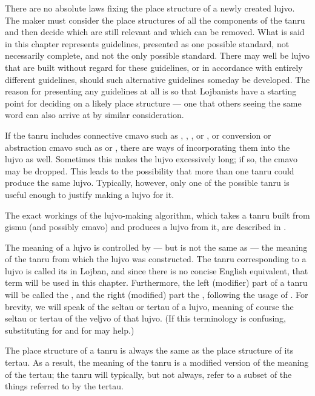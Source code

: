 There are no absolute laws fixing the place structure of a
    newly created lujvo. The maker must consider the place
    structures of all the components of the tanru and then decide
    which are still relevant and which can be removed. What is said
    in this chapter represents guidelines, presented as one
    possible standard, not necessarily complete, and not the only
    possible standard. There may well be lujvo that are built
    without regard for these guidelines, or in accordance with
    entirely different guidelines, should such alternative
    guidelines someday be developed. The reason for presenting any
    guidelines at all is so that Lojbanists have a starting point
    for deciding on a likely place structure --- one that others
    seeing the same word can also arrive at by similar
    consideration.

If the tanru includes connective cmavo such as ,
    , , or , or conversion or abstraction cmavo
    such as  or , there are ways of incorporating them
    into the lujvo as well. Sometimes this makes the lujvo
    excessively long; if so, the cmavo may be dropped. This leads
    to the possibility that more than one tanru could produce the
    same lujvo. Typically, however, only one of the possible tanru
    is useful enough to justify making a lujvo for it.

The exact workings of the lujvo-making algorithm, which
    takes a tanru built from gismu (and possibly cmavo) and
    produces a lujvo from it, are described in .



The meaning of a lujvo is controlled by --- but is not the
    same as --- the meaning of the tanru from which the lujvo was
    constructed. The tanru corresponding to a lujvo is called its
     in Lojban, and since there is no concise English
    equivalent, that term will be used in this chapter.
    Furthermore, the left (modifier) part of a tanru will be called
    the , and the right (modified) part the ,
    following the usage of . For
    brevity, we will speak of the seltau or tertau of a lujvo,
    meaning of course the seltau or tertau of the veljvo of that
    lujvo. (If this terminology is confusing, substituting
     for  and  for  may
    help.)

The place structure of a tanru is always the same as the
    place structure of its tertau. As a result, the meaning of the
    tanru is a modified version of the meaning of the tertau; the
    tanru will typically, but not always, refer to a subset of the
    things referred to by the tertau.

